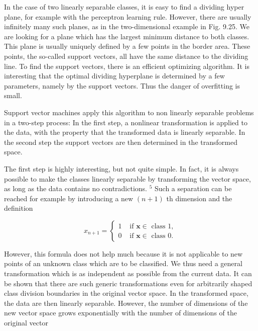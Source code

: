 \documentclass[10pt]{book}
\begin{document}
In the case of two linearly separable classes, it is easy to find a dividing hyper plane, for example with the perceptron learning rule. However, there are usually infinitely many such planes, as in the two-dimensional example in Fig. 9.25. We are looking for a plane which has the largest minimum distance to both classes. This plane is usually uniquely defined by a few points in the border area. These points, the so-called support vectors, all have the same distance to the dividing line. To find the support vectors, there is an efficient optimizing algorithm. It is interesting that the optimal dividing hyperplane is determined by a few parameters, namely by the support vectors. Thus the danger of overfitting is small.

Support vector machines apply this algorithm to non linearly separable problems in a two-step process: In the first step, a nonlinear transformation is applied to the data, with the property that the transformed data is linearly separable. In the second step the support vectors are then determined in the transformed space.

The first step is highly interesting, but not quite simple. In fact, it is always possible to make the classes linearly separable by transforming the vector space, as long as the data contains no contradictions. ${ }^{5}$ Such a separation can be reached for example by introducing a new $(n+1)$ th dimension and the definition

$$
x_{n+1}= \begin{cases}1 & \text { if } \boldsymbol{x} \in \text { class } 1, \\ 0 & \text { if } \boldsymbol{x} \in \text { class } 0 .\end{cases}
$$

However, this formula does not help much because it is not applicable to new points of an unknown class which are to be classified. We thus need a general transformation which is as independent as possible from the current data. It can be shown that there are such generic transformations even for arbitrarily shaped class division boundaries in the original vector space. In the transformed space, the data are then linearly separable. However, the number of dimensions of the new vector space grows exponentially with the number of dimensions of the original vector
\end{document}
